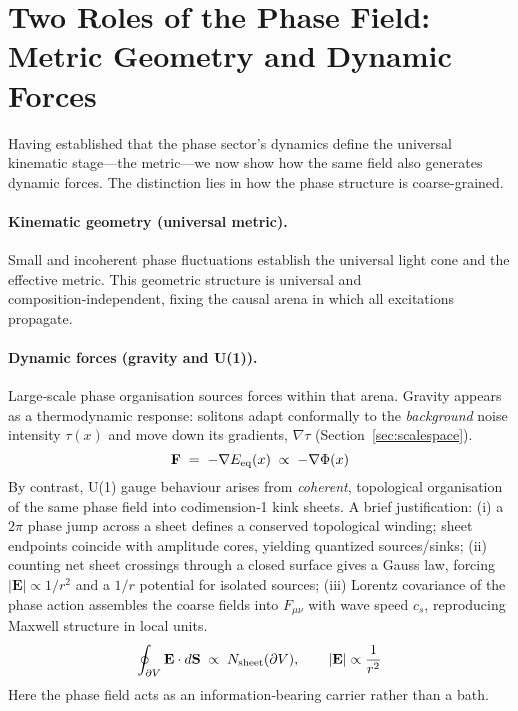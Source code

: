 \documentclass[11pt]{article}
\begin{document}
\section{Two Roles of the Phase Field: Metric Geometry and Dynamic Forces}
Having established that the phase sector's dynamics define the universal kinematic stage—the metric—we now show how the same field also generates dynamic forces. The distinction lies in how the phase structure is coarse-grained.


\paragraph{Kinematic geometry (universal metric).}
Small and incoherent phase fluctuations establish the universal light cone and the effective metric. This geometric structure is universal and composition‑independent, fixing the causal arena in which all excitations propagate.

\paragraph{Dynamic forces (gravity and U(1)).}
Large‑scale phase organisation sources forces within that arena. Gravity appears as a thermodynamic response: solitons adapt conformally to the \emph{background} noise intensity $\tau(x)$ and move down its gradients, $\nabla\tau$ (Section~\ref{sec:scalespace}).
\begin{equation*}
  \mathbf F \;=\; -\nabla E_{\rm eq}(x) \;\propto\; -\nabla\Phi(x)
\end{equation*}
By contrast, U(1) gauge behaviour arises from \emph{coherent}, topological organisation of the same phase field into codimension‑1 kink sheets. A brief justification: (i) a $2\pi$ phase jump across a sheet defines a conserved topological winding; sheet endpoints coincide with amplitude cores, yielding quantized sources/sinks; (ii) counting net sheet crossings through a closed surface gives a Gauss law, forcing $|\mathbf E|\propto 1/r^2$ and a $1/r$ potential for isolated sources; (iii) Lorentz covariance of the phase action assembles the coarse fields into $F_{\mu\nu}$ with wave speed $c_s$, reproducing Maxwell structure in local units.
\begin{equation*}
  \oint_{\partial V} \mathbf E\cdot d\mathbf S \;\propto\; N_{\rm sheet}(\partial V),\qquad |\mathbf E|\propto \frac{1}{r^2}
\end{equation*}
Here the phase field acts as an information‑bearing carrier rather than a bath.
\end{document}
